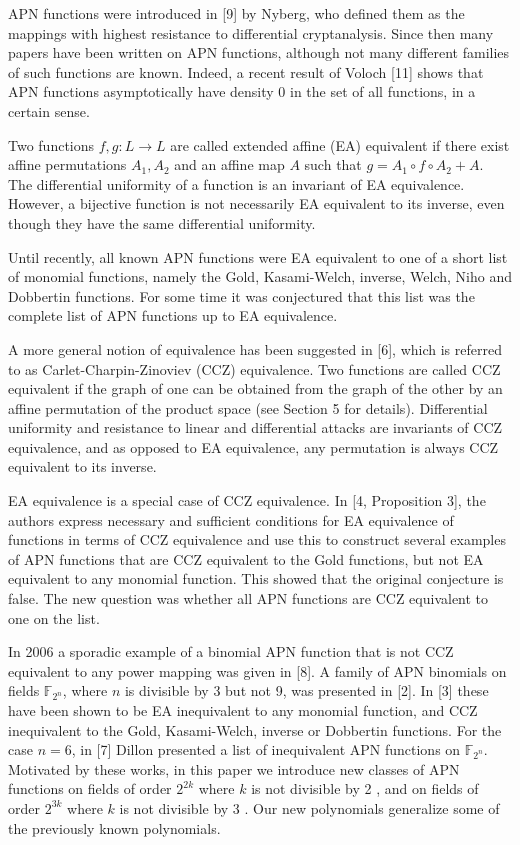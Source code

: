 \documentclass[10pt]{article}
\begin{document}
APN functions were introduced in [9] by Nyberg, who defined them as the mappings with highest resistance to differential cryptanalysis. Since then many papers have been written on APN functions, although not many different families of such functions are known. Indeed, a recent result of Voloch [11] shows that APN functions asymptotically have density 0 in the set of all functions, in a certain sense.

Two functions $f, g: L \rightarrow L$ are called extended affine (EA) equivalent if there exist affine permutations $A_{1}, A_{2}$ and an affine map $A$ such that $g=A_{1} \circ f \circ A_{2}+A$. The differential uniformity of a function is an invariant of EA equivalence. However, a bijective function is not necessarily EA equivalent to its inverse, even though they have the same differential uniformity.

Until recently, all known APN functions were EA equivalent to one of a short list of monomial functions, namely the Gold, Kasami-Welch, inverse, Welch, Niho and Dobbertin functions. For some time it was conjectured that this list was the complete list of APN functions up to EA equivalence.

A more general notion of equivalence has been suggested in [6], which is referred to as Carlet-Charpin-Zinoviev (CCZ) equivalence. Two functions are called CCZ equivalent if the graph of one can be obtained from the graph of the other by an affine permutation of the product space (see Section 5 for details). Differential uniformity and resistance to linear and differential attacks are invariants of CCZ equivalence, and as opposed to EA equivalence, any permutation is always CCZ equivalent to its inverse.

EA equivalence is a special case of CCZ equivalence. In [4, Proposition 3], the authors express necessary and sufficient conditions for EA equivalence of functions in terms of CCZ equivalence and use this to construct several examples of APN functions that are CCZ equivalent to the Gold functions, but not EA equivalent to any monomial function. This showed that the original conjecture is false. The new question was whether all APN functions are CCZ equivalent to one on the list.

In 2006 a sporadic example of a binomial APN function that is not CCZ equivalent to any power mapping was given in [8]. A family of APN binomials on fields $\mathbb{F}_{2^{n}}$, where $n$ is divisible by 3 but not 9, was presented in [2]. In [3] these have been shown to be EA inequivalent to any monomial function, and CCZ inequivalent to the Gold, Kasami-Welch, inverse or Dobbertin functions. For the case $n=6$, in [7] Dillon presented a list of inequivalent APN functions on $\mathbb{F}_{2^{n}}$. Motivated by these works, in this paper we introduce new classes of APN functions on fields of order $2^{2 k}$ where $k$ is not divisible by 2 , and on fields of order $2^{3 k}$ where $k$ is not divisible by 3 . Our new polynomials generalize some of the previously known polynomials.
\end{document}
